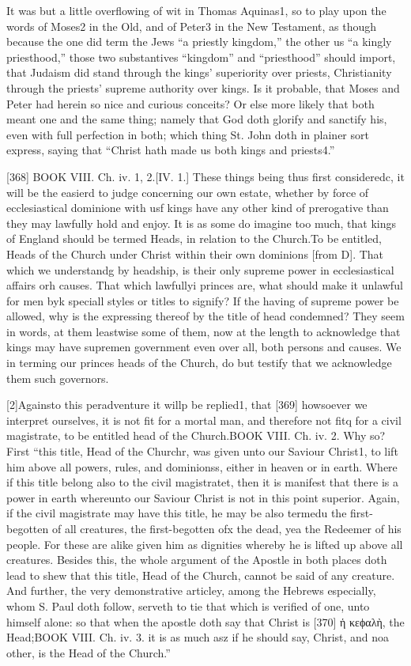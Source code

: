 It was but a little overflowing of wit in Thomas Aquinas1, so to play upon the words of Moses2 in the Old, and of Peter3 in the New Testament, as though because the one did term the Jews “a priestly kingdom,” the other us “a kingly priesthood,” those two substantives “kingdom” and “priesthood” should import, that Judaism did stand through the kings’ superiority over priests, Christianity through the priests’ supreme authority over kings. Is it probable, that Moses and Peter had herein so nice and curious conceits? Or else more likely that both meant one and the same thing; namely that God doth glorify and sanctify his, even with full perfection in both; which thing St. John doth in plainer sort express, saying that “Christ hath made us both kings and priests4.”

[368]
BOOK VIII. Ch. iv. 1, 2.[IV. 1.] These things being thus first consideredc, it will be the easierd to judge concerning our own estate, whether by force of ecclesiastical dominione with usf kings have any other kind of prerogative than they may lawfully hold and enjoy. It is as some do imagine too much, that kings of England should be termed Heads, in relation to the Church.To be entitled, Heads of the Church under Christ within their own dominions [from D]. That which we understandg by headship, is their only supreme power in ecclesiastical affairs orh causes. That which lawfullyi princes are, what should make it unlawful for men byk speciall styles or titles to signify? If the having of supreme power be allowed, why is the expressing thereof by the title of head condemned? They seem in words, at them leastwise some of them, now at the length to acknowledge that kings may have supremen government even over all, both persons and causes. We in terming our princes heads of the Church, do but testify that we acknowledge them such governors.

[2]Againsto this peradventure it willp be replied1, that [369] howsoever we interpret ourselves, it is not fit for a mortal man, and therefore not fitq for a civil magistrate, to be entitled head of the Church.BOOK VIII. Ch. iv. 2. Why so? First “this title, Head of the Churchr, was given unto our Saviour Christ1, to lift him above all powers, rules, and dominionss, either in heaven or in earth. Where if this title belong also to the civil magistratet, then it is manifest that there is a power in earth whereunto our Saviour Christ is not in this point superior. Again, if the civil magistrate may have this title, he may be also termedu the first-begotten of all creatures, the first-begotten ofx the dead, yea the Redeemer of his people. For these are alike given him as dignities whereby he is lifted up above all creatures. Besides this, the whole argument of the Apostle in both places doth lead to shew that this title, Head of the Church, cannot be said of any creature. And further, the very demonstrative articley, among the Hebrews especially, whom S. Paul doth follow, serveth to tie that which is verified of one, unto himself alone: so that when the apostle doth say that Christ is [370] ἡ κεϕαλὴ, the Head;BOOK VIII. Ch. iv. 3. it is as much asz if he should say, Christ, and noa other, is the Head of the Church.”

